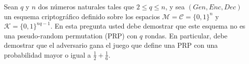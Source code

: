 
Sean $q$ y $n$ dos números naturales tales que $2 \leq q \leq n$, y sea $(\textit{Gen}, \textit{Enc}, \textit{Dec})$ un esquema criptográfico definido sobre los espacios $\mathcal{M} = \mathcal{C} = \{0,1\}^n$ y $\mathcal{K} = \{0, 1\}^{nq - 1}$. En esta pregunta usted debe demostrar que este esquema no es una pseudo-random permutation (PRP) con $q$ rondas. En particular, debe demostrar que el adversario gana el juego que define una PRP con una probabilidad mayor o igual a $\frac{1}{2} + \frac{1}{6}$.
